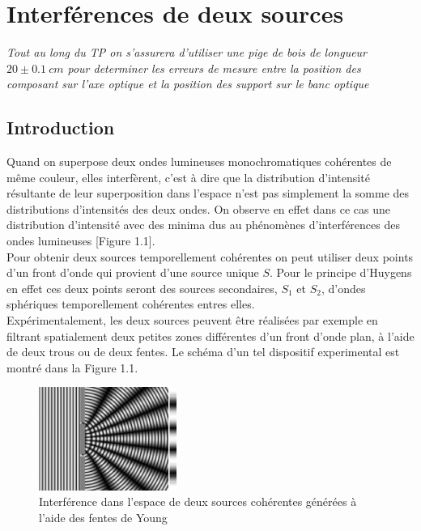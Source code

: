 \documentclass[11pt, openright]{book}
\begin{document}
        

        

	
    \newpage
	
	\chapter{Interférences de deux sources}

	\vspace{-2cm}
	\textit{Tout au long du TP on s'assurera d'utiliser une pige de bois de longueur $20\pm 0.1\ cm$ pour determiner les erreurs de mesure entre la position des composant sur l'axe optique et la position des support sur le banc optique}
		

		\section{Introduction}
			
			Quand on superpose deux ondes lumineuses monochromatiques cohérentes de même couleur, elles interfèrent, c'est à dire que la distribution d'intensité résultante de leur superposition dans l'espace n'est pas simplement la somme des distributions d'intensités des deux ondes. On observe en effet dans ce cas une distribution d'intensité  avec des minima dus au phénomènes d'interférences des ondes lumineuses [Figure 1.1].\\
			Pour obtenir deux sources temporellement cohérentes on peut utiliser deux points d'un front d'onde qui provient d'une source unique $S$. Pour le principe d'Huygens en effet ces deux points seront des sources secondaires, $S_1$ et $S_2$, d'ondes sphériques temporellement cohérentes entres elles.\\
			Expérimentalement, les deux sources peuvent être réalisées par exemple en filtrant spatialement deux petites zones différentes d'un front d'onde plan, à l'aide de deux trous ou de deux fentes. Le schéma d'un tel dispositif experimental est montré dans la Figure 1.1.

			\begin{figure}[ht!]
				\centering
				\includegraphics[width=0.4\textwidth]{./object/g1.png}
				\caption{Interférence dans l'espace de deux sources cohérentes générées à l'aide des fentes de Young}
			\end{figure}
\end{document}
